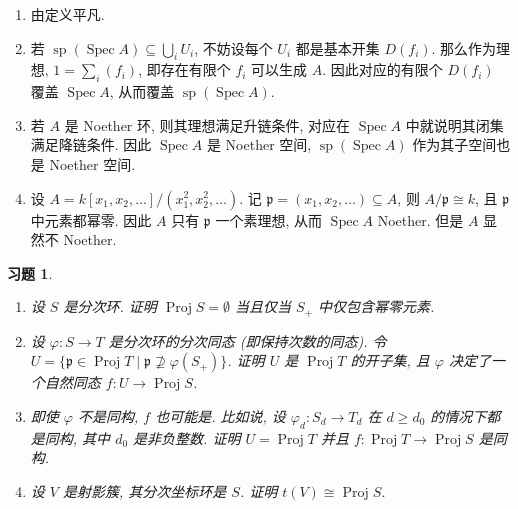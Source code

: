 \documentclass{article}
\theoremstyle{exercise}
\newtheorem{exercise}{习题}[section]
\newenvironment{proofc}{\proof}{\endproof}
\def\gp{\mathfrak{p}}
\def\spp{\operatorname{sp}}
\def\Spec{\operatorname{Spec}}
\def\Proj{\operatorname{Proj}}
\def\geq{\geqslant}
\begin{document}
\begin{proofc}
  \begin{enumerate}[label={(\alph*)}]
    \item 由定义平凡.
    \item 若 $\spp(\Spec A) \subseteq \bigcup_i U_i$,
          不妨设每个 $U_i$ 都是基本开集 $D(f_i)$.
          那么作为理想, $1 = \sum_i (f_i)$, 即存在有限个 $f_i$ 可以生成 $A$.
          因此对应的有限个 $D(f_i)$ 覆盖 $\Spec A$, 从而覆盖 $\spp(\Spec A)$.
    \item 若 $A$ 是 Noether 环, 则其理想满足升链条件,
          对应在 $\Spec A$ 中就说明其闭集满足降链条件.
          因此 $\Spec A$ 是 Noether 空间, $\spp(\Spec A)$ 作为其子空间也是 Noether 空间.
    \item 设 $A = k[x_1, x_2, \dots] / (x_1^2, x_2^2, \dots)$.
          记 $\gp = (x_1, x_2, \dots) \subseteq A$, 则 $A / \gp \cong k$,
          且 $\gp$ 中元素都幂零. 因此 $A$ 只有 $\gp$ 一个素理想, 从而 $\Spec A$ Noether.
          但是 $A$ 显然不 Noether.
          \qedhere
  \end{enumerate}
\end{proofc}

\begin{exercise}
  \begin{enumerate}[label={(\alph*)}]
    \item 设 $S$ 是分次环. 证明 $\Proj S = \emptyset$ 当且仅当 $S_+$ 中仅包含幂零元素.
    \item 设 $\varphi \colon S \to T$ 是分次环的分次同态 (即保持次数的同态).
          令 $U = \{ \gp \in \Proj T \mid \gp \not \supseteq \varphi(S_+) \}$.
          证明 $U$ 是 $\Proj T$ 的开子集,
          且 $\varphi$ 决定了一个自然同态 $f \colon U \to \Proj S$.
    \item 即使 $\varphi$ 不是同构, $f$ 也可能是.
          比如说, 设 $\varphi_d \colon S_d \to T_d$ 在 $d \geq d_0$ 的情况下都是同构,
          其中 $d_0$ 是非负整数. 证明 $U = \Proj T$ 并且 $f \colon \Proj T \to \Proj S$ 是同构.
    \item 设 $V$ 是射影簇, 其分次坐标环是 $S$. 证明 $t(V) \cong \Proj S$.
  \end{enumerate}
\end{exercise}
\end{document}
